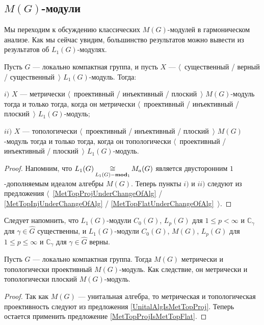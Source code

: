 
\subsection{\texorpdfstring{$M(G)$}{M(G)}-модули}
\label{SubSectionMGModules}

Мы переходим к обсуждению классических $M(G)$-модулей в гармоническом анализе. Как мы сейчас увидим, большинство результатов можно вывести из результатов об $L_1(G)$-модулях.

\begin{proposition}\label{MGMetTopProjInjFlatRedToL1} Пусть $G$ --- локально компактная группа, и пусть $X$ --- $\langle$~существенный / верный / существенный~$\rangle$ $L_1(G)$-модуль. Тогда:

$i)$ $X$ --- метрически $\langle$~проективный / инъективный / плоский~$\rangle$ $M(G)$-модуль тогда и только тогда, когда он метрически $\langle$~проективный / инъективный / плоский~$\rangle$ $L_1(G)$-модуль;

$ii)$ $X$ --- топологически $\langle$~проективный / инъективный / плоский~$\rangle$ $M(G)$-модуль тогда и только тогда, когда он топологически $\langle$~проективный / инъективный / плоский~$\rangle$ $L_1(G)$-модуль.
\end{proposition}
\begin{proof} Напомним, что $L_1(G)\mathop{\mathbin{\cong}}\limits_{L_1(G)-\mathbf{mod}_1}M_a(G)$ является двусторонним $1$-дополняемым идеалом алгебры $M(G)$. Теперь пункты $i)$ и $ii)$ следуют из предложения $\langle$~\ref{MetTopProjUnderChangeOfAlg} / \ref{MetTopInjUnderChangeOfAlg}  / \ref{MetTopFlatUnderChangeOfAlg}~$\rangle$.
\end{proof} 

Следует напомнить, что $L_1(G)$-модули $C_0(G)$, $L_p(G)$ для $1\leq p<\infty$ и $\mathbb{C}_\gamma$ для $\gamma\in\widehat{G}$ существенны, и $L_1(G)$-модули $C_0(G)$, $M(G)$, $L_p(G)$ для $1\leq p\leq \infty$ и $\mathbb{C}_\gamma$ для $\gamma\in\widehat{G}$ верны. 

\begin{proposition}\label{MGModMGMetTopProjFlatCharac} Пусть $G$ --- локально компактная группа. Тогда $M(G)$ метрически и топологически проективный $M(G)$-модуль. Как следствие, он метрически и топологически плоский $M(G)$-модуль.
\end{proposition} 
\begin{proof} Так как $M(G)$ --- унитальная алгебра, то метрическая и топологическая проективность следуют из предложения \ref{UnitalAlgIsMetTopProj}. Теперь остается применить предложение \ref{MetTopProjIsMetTopFlat}.
\end{proof}

